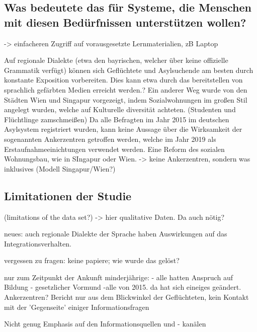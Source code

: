 \subsection{Was bedeutete das für Systeme, die Menschen mit diesen Bedürfnissen unterstützen wollen?}

->  einfacheren Zugriff auf vorausgesetzte Lernmaterialien, zB Laptop

Auf regionale Dialekte (etwa den bayrischen, welcher über keine offizielle Grammatik verfügt) können sich Geflüchtete und Asylsuchende am besten durch konstante Exposition vorbereiten. Dies kann etwa durch das bereitstellen von sprachlich gefärbten Medien erreicht werden.?
Ein anderer Weg wurde von den Städten Wien und Singapur vorgezeigt, indem Sozialwohnungen im großen Stil angelegt wurden, welche auf Kulturelle diversität achteten. (Studenten und Flüchtlinge zamschmeißen)
Da alle Befragten im Jahr 2015 im deutschen Asylsystem registriert wurden, kann keine Aussage über die Wirksamkeit der sogenannten Ankerzentren getroffen werden, welche im Jahr 2019 als Erstaufnahmeeinichtungen verwendet werden.
Eine Reform des sozialen Wohnungsbau, wie in SIngapur\cite{vasoo2001singapore}\cite{yuen2005squatters}\cite{phang2001housing} oder Wien\cite{reinprecht2007social}.
        -> keine Ankerzentren, sondern was inklusives (Modell Singapur/Wien?)



\subsection{Limitationen der Studie}

(limitations of the data set?) -> hier qualitative Daten. Da auch nötig?

neues: auch regionale Dialekte der Sprache haben Auswirkungen auf das Integrationsverhalten.

vergessen zu fragen: keine papiere; wie wurde das gelöst?

nur zum Zeitpunkt der Ankunft minderjährige:
    - alle hatten Anspruch auf Bildung
    - gesetzlicher Vormund
    -alle von 2015. da hat sich eineiges geändert. Ankerzentren?
Bericht nur aus dem Blickwinkel der Geflüchteten, kein Kontakt mit der 'Gegenseite' einiger Informationsfragen

    Nicht genug Emphasis auf den Informationsquellen und - kanälen